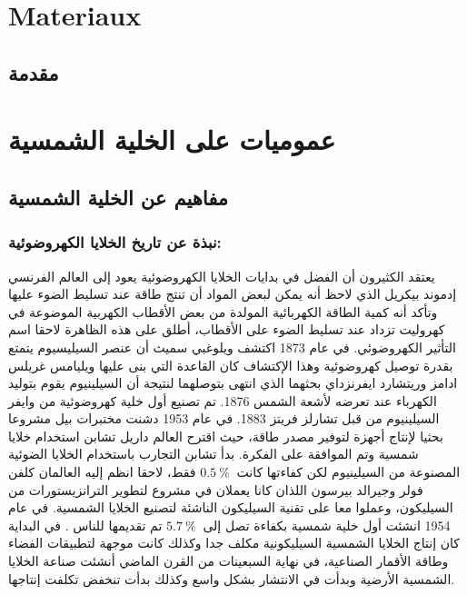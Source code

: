 \chapter{Materiaux} %

\label{Chapter1} %

\section*{مقدمة}


\chapter{عموميات على الخلية الشمسية}

\section {مفاهيم عن الخلية الشمسية  }
\subsection{نبذة عن تاريخ الخلايا الكهروضوئية:}
يعتقد الكثيرون أن الفضل في بدايات الخلايا الكهروضوئية يعود إلى العالم الفرنسي إدموند بيكريل الذي لاحظ أنه يمكن لبعض المواد أن تنتج طاقة عند تسليط الضوء عليها وتأكد أنه كمية الطاقة الكهربائية المولدة من بعض الأقطاب الكهربية الموضوعة في كهروليت تزداد عند تسليط الضوء على الأقطاب، أطلق على هذه الظاهرة لاحقا اسم التأثير الكهروضوئي.
في عام 1873 اكتشف ويلوغبي سميث أن عنصر السيليسيوم يتمتع بقدرة توصيل كهروضوئية وهذا الإكتشاف كان القاعدة التي بنى عليها ويليامس غريلس ادامز وريتشارد ايفرنزداي بحثهما الذي انتهى بتوصلهما لنتيجة أن السيلينيوم يقوم بتوليد الكهرباء عند تعرضه لأشعة الشمس 1876. تم تصنيع أول خلية كهروضوئية من وايفر السيلينيوم من قبل تشارلز فريتز 1883.
في عام 1953 دشنت مختبرات بيل مشروعا بحثيا لإنتاج أجهزة لتوفير مصدر طاقة، حيث اقترح العالم داريل تشابن استخدام خلايا شمسية وتم الموافقة على الفكرة. بدأ تشابن التجارب باستخدام الخلايا الضوئية المصنوعة من السيلينيوم لكن كفاءتها كانت $ 0.5~\%~   $ فقط، لاحقا انظم إليه العالمان كلفن فولر وجيرالد بيرسون اللذان كانا يعملان في مشروع لتطوير الترانزيستورات من السيليكون، وعملوا معا على تقنية السيليكون الناشئة لتصنيع الخلايا الشمسية. في عام 1954  انشئت أول خلية شمسية بكفاءة تصل إلى $ 5.7~\%~   $  تم تقديمها للناس \cite{a1}.
في البداية كان إنتاج الخلايا الشمسية السيليكونية مكلف جدا وكذلك كانت موجهة لتطبيقات الفضاء وطاقة الأقمار الصناعية، في نهاية السبعينات من القرن الماضي أنشئت صناعة الخلايا الشمسية الأرضية وبدأت في الانتشار بشكل واسع وكذلك بدأت تنخفض تكلفت إنتاجها.
